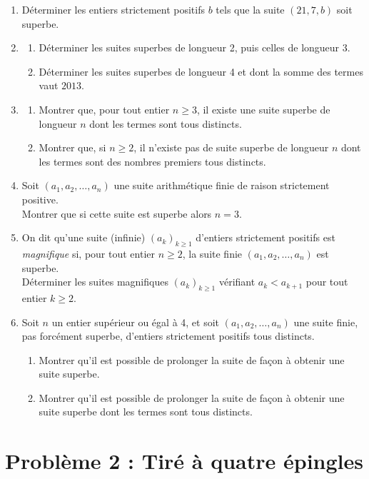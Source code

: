 \documentclass[landscape,twocolumn,leqno,a4paper,10pt]{report} %
\renewcommand{\geq}{\geqslant}
\begin{document}
\begin{enumerate}
	\item Déterminer les entiers strictement positifs $b$ tels que la suite $(21,7, b)$ soit superbe.
	\item \begin{enumerate}
		\item Déterminer les suites superbes de longueur 2, puis celles de longueur $3$.
		\item Déterminer les suites superbes de longueur 4 et dont la somme des termes vaut $2013$.
	\end{enumerate}
	\item \begin{enumerate}
		\item Montrer que, pour tout entier $n \geq 3$, il existe une suite superbe de longueur $n$ dont les termes sont tous distincts.
		\item Montrer que, si $n \geq 2$, il n'existe pas de suite superbe de longueur $n$ dont les termes sont des nombres premiers tous distincts.
	\end{enumerate}
	\item Soit $\left(a_{1}, a_{2}, \ldots, a_{n}\right)$ une suite arithmétique finie de raison strictement positive.\\
	Montrer que si cette suite est superbe alors $n=3$.
	\item On dit qu'une suite (infinie) $\left(a_{k}\right)_{k \geq 1}$ d'entiers strictement positifs est \textit{magnifique} si, pour tout entier $n \geq 2$, la suite finie $\left(a_{1}, a_{2}, \ldots, a_{n}\right)$ est superbe.\\
	Déterminer les suites magnifiques $\left(a_{k}\right)_{k \geq 1}$ vérifiant $a_{k}<a_{k+1}$ pour tout entier $k \geq 2$.
	\item Soit $n$ un entier supérieur ou égal à 4, et soit $\left(a_{1}, a_{2}, \ldots, a_{n}\right)$ une suite finie, pas forcément superbe, d'entiers strictement positifs tous distincts.
	\begin{enumerate}
		\item Montrer qu'il est possible de prolonger la suite de façon à obtenir une suite superbe.
		\item Montrer qu'il est possible de prolonger la suite de façon à obtenir une suite superbe dont les termes sont tous distincts.
	\end{enumerate}
\end{enumerate}


\section{Problème 2 : Tiré à quatre épingles}
\end{document}
